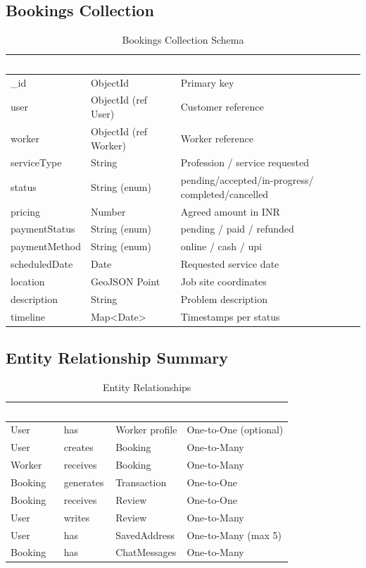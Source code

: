 \documentclass[12pt,a4paper]{report}
\newcommand{\thead}[1]{\cellcolor{tableheader}\textcolor{white}{\textbf{#1}}}
\begin{document}
\subsection{Bookings Collection}

\begin{table}[h!]
\centering
\caption{Bookings Collection Schema}
\renewcommand{\arraystretch}{1.3}
\begin{tabular}{|p{3.5cm}|p{2.5cm}|p{7cm}|}
\hline
\thead{Field} & \thead{Type} & \thead{Description} \\
\hline
\_id & ObjectId & Primary key \\
user & ObjectId (ref User) & Customer reference \\
worker & ObjectId (ref Worker) & Worker reference \\
serviceType & String & Profession / service requested \\
status & String (enum) & pending/accepted/in-progress/ completed/cancelled \\
pricing & Number & Agreed amount in INR \\
paymentStatus & String (enum) & pending / paid / refunded \\
paymentMethod & String (enum) & online / cash / upi \\
scheduledDate & Date & Requested service date \\
location & GeoJSON Point & Job site coordinates \\
description & String & Problem description \\
timeline & Map\textless{}Date\textgreater & Timestamps per status \\
\hline
\end{tabular}
\end{table}

\subsection{Entity Relationship Summary}

\begin{table}[h!]
\centering
\caption{Entity Relationships}
\renewcommand{\arraystretch}{1.3}
\begin{tabular}{|p{4cm}|p{2cm}|p{4cm}|p{4cm}|}
\hline
\thead{Entity A} & \thead{Relation} & \thead{Entity B} & \thead{Cardinality} \\
\hline
User & has & Worker profile & One-to-One (optional) \\
User & creates & Booking & One-to-Many \\
Worker & receives & Booking & One-to-Many \\
Booking & generates & Transaction & One-to-One \\
Booking & receives & Review & One-to-One \\
User & writes & Review & One-to-Many \\
User & has & SavedAddress & One-to-Many (max 5) \\
Booking & has & ChatMessages & One-to-Many \\
\hline
\end{tabular}
\end{table}
\end{document}
